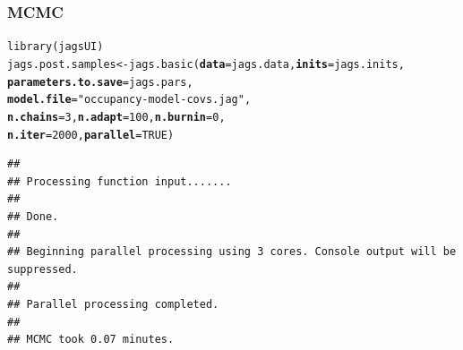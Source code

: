 \documentclass[color=usenames,dvipsnames]{beamer}\usepackage[]{graphicx}\usepackage[]{xcolor}
\makeatletter
\newcommand{\hlnum}[1]{\textcolor[rgb]{0.69,0.494,0}{#1}}%
\newcommand{\hlsng}[1]{\textcolor[rgb]{0.749,0.012,0.012}{#1}}%
\newcommand{\hldef}[1]{\textcolor[rgb]{0,0,0}{#1}}%
\newcommand{\hlkwb}[1]{\textcolor[rgb]{0,0.341,0.682}{#1}}%
\newcommand{\hlkwc}[1]{\textcolor[rgb]{0,0,0}{\textbf{#1}}}%
\newcommand{\hlkwd}[1]{\textcolor[rgb]{0.004,0.004,0.506}{#1}}%
\newenvironment{kframe}{%
 \def\at@end@of@kframe{}%
 \ifinner\ifhmode%
  \def\at@end@of@kframe{\end{minipage}}%
  \begin{minipage}{\columnwidth}%
 \fi\fi%
 \def\FrameCommand##1{\hskip\@totalleftmargin \hskip-\fboxsep
 \colorbox{shadecolor}{##1}\hskip-\fboxsep
     \hskip-\linewidth \hskip-\@totalleftmargin \hskip\columnwidth}%
 \MakeFramed {\advance\hsize-\width
   \@totalleftmargin\z@ \linewidth\hsize
   \@setminipage}}%
 {\par\unskip\endMakeFramed%
 \at@end@of@kframe}
\newenvironment{knitrout}{}{} %
\makeatother
\begin{document}
\begin{frame}[fragile]
  \frametitle{MCMC}
  \small
\begin{knitrout}\scriptsize
{}\color{fgcolor}\begin{kframe}
\begin{alltt}
\hlkwd{library}\hldef{(jagsUI)}
\hldef{jags.post.samples} \hlkwb{<-} \hlkwd{jags.basic}\hldef{(}\hlkwc{data}\hldef{=jags.data,} \hlkwc{inits}\hldef{=jags.inits,}
                                \hlkwc{parameters.to.save}\hldef{=jags.pars,}
                                \hlkwc{model.file}\hldef{=}\hlsng{"occupancy-model-covs.jag"}\hldef{,}
                                \hlkwc{n.chains}\hldef{=}\hlnum{3}\hldef{,} \hlkwc{n.adapt}\hldef{=}\hlnum{100}\hldef{,} \hlkwc{n.burnin}\hldef{=}\hlnum{0}\hldef{,}
                                \hlkwc{n.iter}\hldef{=}\hlnum{2000}\hldef{,} \hlkwc{parallel}\hldef{=}\hlnum{TRUE}\hldef{)}
\end{alltt}
\begin{verbatim}
## 
## Processing function input....... 
## 
## Done. 
##  
## Beginning parallel processing using 3 cores. Console output will be suppressed.
## 
## Parallel processing completed.
## 
## MCMC took 0.07 minutes.
\end{verbatim}
\end{kframe}
\end{knitrout}
\end{frame}
\end{document}
